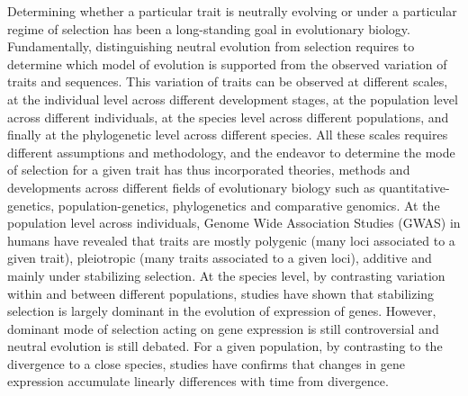 \documentclass{article}
\begin{document}
Determining whether a particular trait is neutrally evolving or under a particular regime of selection has been a long-standing goal in evolutionary biology.
Fundamentally, distinguishing neutral evolution from selection requires to determine which model of evolution is supported from the observed variation of traits and sequences.
This variation of traits can be observed at different scales, at the individual level across different development stages, at the population level across different individuals, at the species level across different populations, and finally at the phylogenetic level across different species.
All these scales requires different assumptions and methodology, and the endeavor to determine the mode of selection for a given trait has thus incorporated theories, methods and developments across different fields of evolutionary biology such as quantitative-genetics, population-genetics, phylogenetics and comparative genomics\cite{lynch_genetics_1998, walsh_evolution_2018}.
At the population level across individuals, Genome Wide Association Studies (GWAS) in humans have revealed that traits are mostly polygenic (many loci associated to a given trait), pleiotropic (many traits associated to a given loci), additive and mainly under stabilizing selection\cite{simons_population_2018, sella_thinking_2019}.
At the species level, by contrasting variation within and between different populations, studies have shown that stabilizing selection is largely dominant in the evolution of expression of genes\cite{whitehead_neutral_2006, gilad_natural_2006, gilad_expression_2006}.
However, dominant mode of selection acting on gene expression is still controversial and neutral evolution is still debated\cite{signor_evolution_2018, price_detecting_2022}.
For a given population, by contrasting to the divergence to a close species, studies have confirms that changes in gene expression accumulate linearly differences with time from divergence\cite{khaitovich_neutral_2004}.
\end{document}
